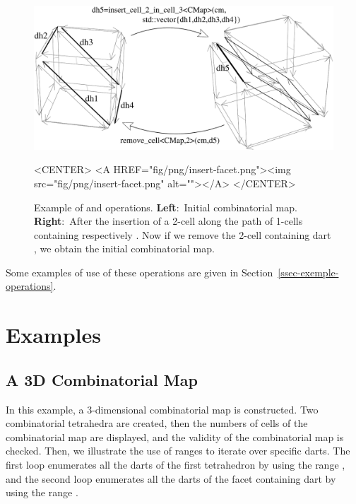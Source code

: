 \begin{figure}[htb]
  \begin{ccTexOnly}
    \begin{center}
      \includegraphics[width=.75\textwidth]{Combinatorial_map/fig/pdf/insert-facet}
    \end{center}
  \end{ccTexOnly}
  \begin{ccHtmlOnly}
    <CENTER> <A HREF="fig/png/insert-facet.png"><img
    src="fig/png/insert-facet.png" alt=""></A> </CENTER>
  \end{ccHtmlOnly}
  \caption{Example of  and
     operations. \textbf{Left}:~Initial
    combinatorial map.  \textbf{Right}:~After the insertion of a
    2-cell along the path of 1-cells containing respectively
    .  Now if we remove the 2-cell containing dart
    , we obtain the initial combinatorial map.}
  \label{fig-insert-face}
\end{figure}

Some examples of use of these operations are given in
Section~\ref{ssec-exemple-operations}.

\section{Examples}

\subsection{A 3D Combinatorial Map}\label{ssec-example-3DCM}

In this example, a 3-dimensional combinatorial map is constructed. Two
combinatorial tetrahedra are created, then the numbers of cells of the
combinatorial map are displayed, and the validity of the combinatorial
map is checked.  Then, we illustrate the use of ranges to iterate over
specific darts.  The first loop enumerates all the darts of the first
tetrahedron by using the range , and the
second loop enumerates all the darts of the facet containing dart
 by using the range
.

